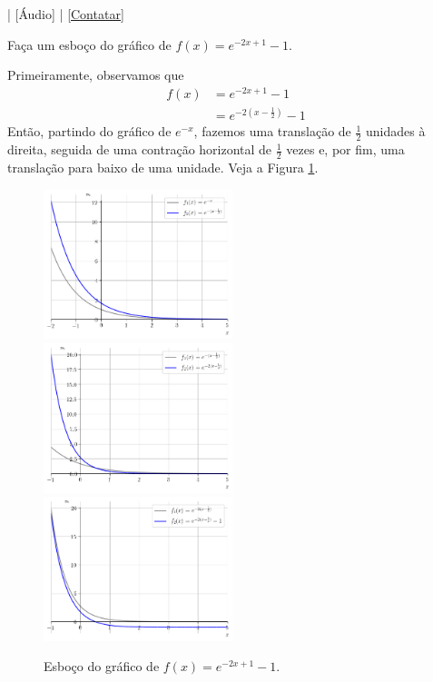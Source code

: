 \begin{flushright}
  [Vídeo] | [Áudio] | \href{https://phkonzen.github.io/notas/contato.html}{[Contatar]}
\end{flushright}

\begin{exeresol}
  Faça um esboço do gráfico de $f(x) = e^{-2x+1}-1$.
\end{exeresol}
\begin{resol}
  Primeiramente, observamos que
  \begin{align}
    f(x) &= e^{-2x+1}-1\\
         &= e^{-2\left(x-\frac{1}{2}\right)}-1
  \end{align}
  Então, partindo do gráfico de $e^{-x}$, fazemos uma translação de $\frac{1}{2}$ unidades à direita, seguida de uma contração horizontal de $\frac{1}{2}$ vezes e, por fim, uma translação para baixo de uma unidade. Veja a Figura \ref{fig:exeresol_funexp_graf}.

  \begin{figure}[H]
    \centering
    \includegraphics[width=0.49\textwidth]{./cap_funcao/dados/fig_exeresol_funexp_graf/fig_exeresol_funexp_graf_1}\\
    \includegraphics[width=0.49\textwidth]{./cap_funcao/dados/fig_exeresol_funexp_graf/fig_exeresol_funexp_graf_2}\\
    \includegraphics[width=0.49\textwidth]{./cap_funcao/dados/fig_exeresol_funexp_graf/fig_exeresol_funexp_graf_3}
    \caption{Esboço do gráfico de $f(x) = e^{-2x+1}-1$.}
    \label{fig:exeresol_funexp_graf}
  \end{figure}
\end{resol}

